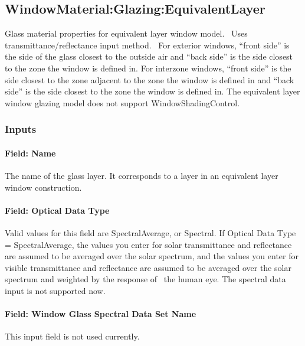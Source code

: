 \subsection{WindowMaterial:Glazing:EquivalentLayer}\label{windowmaterialglazingequivalentlayer}

Glass material properties for equivalent layer window model.~ Uses transmittance/reflectance input method.~ For exterior windows, ``front side'' is the side of the glass closest to the outside air and ``back side'' is the side closest to the zone the window is defined in. For interzone windows, ``front side'' is the side closest to the zone adjacent to the zone the window is defined in and ``back side'' is the side closest to the zone the window is defined in. The equivalent layer window glazing model does not support WindowShadingControl.

\subsubsection{Inputs}\label{inputs-30-001}

\paragraph{Field: Name}\label{field-name-24-002}

The name of the glass layer. It corresponds to a layer in an equivalent layer window construction.

\paragraph{Field: Optical Data Type}\label{field-optical-data-type-1}

Valid values for this field are SpectralAverage, or Spectral. If Optical Data Type = SpectralAverage, the values you enter for solar transmittance and reflectance are assumed to be averaged over the solar spectrum, and the values you enter for visible transmittance and reflectance are assumed to be averaged over the solar spectrum and weighted by the response of~ the human eye. The spectral data input is not supported now.

\paragraph{Field: Window Glass Spectral Data Set Name}\label{field-window-glass-spectral-data-set-name-0}

This input field is not used currently.

